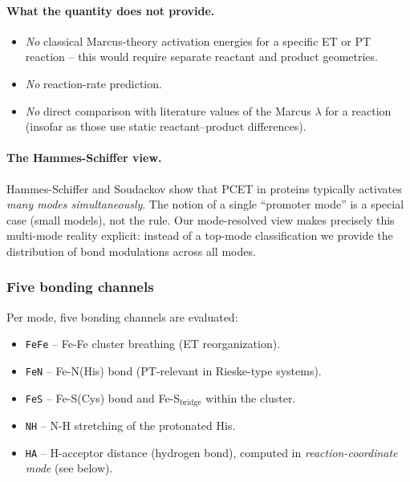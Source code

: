 \documentclass[11pt,a4paper,twoside]{article}
\theoremstyle{remark}
\begin{document}
\paragraph{What the quantity does not provide.}
\begin{itemize}\setlength{\itemsep}{0pt}
  \item \emph{No} classical Marcus-theory activation energies for
        a specific ET or PT reaction -- this would require
        separate reactant and product geometries.
  \item \emph{No} reaction-rate prediction.
  \item \emph{No} direct comparison with literature values of the
        Marcus $\lambda$ for a reaction (insofar as those use
        static reactant--product differences).
\end{itemize}

\paragraph{The Hammes-Schiffer view.}
Hammes-Schiffer and Soudackov \cite{HammesSchifferSoudackov2008}
show that PCET in proteins typically activates \emph{many modes
simultaneously}. The notion of a single ``promoter mode'' is a
special case (small models), not the rule. Our mode-resolved view
makes precisely this multi-mode reality explicit: instead of a
top-mode classification we provide the distribution of bond
modulations across all modes.

\subsubsection*{Five bonding channels}

Per mode, five bonding channels are evaluated:

\begin{itemize}\setlength{\itemsep}{0pt}
  \item \texttt{FeFe} -- Fe-Fe cluster breathing (ET reorganization).
  \item \texttt{FeN} -- Fe-N(His) bond (PT-relevant in
        Rieske-type systems).
  \item \texttt{FeS} -- Fe-S(Cys) bond and Fe-S$_\text{bridge}$
        within the cluster.
  \item \texttt{NH} -- N-H stretching of the protonated His.
  \item \texttt{HA} -- H-acceptor distance (hydrogen bond),
        computed in \emph{reaction-coordinate mode} (see below).
\end{itemize}
\end{document}
